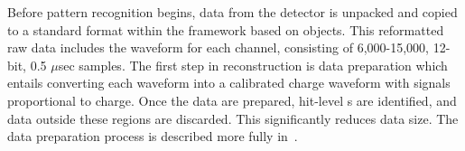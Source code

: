 Before pattern recognition begins, data from the  detector is
unpacked and copied to a standard format within the  framework based on  objects. 
This reformatted raw data includes the waveform for each channel, consisting of 6,000-15,000,  12-bit, 0.5 $\mu$sec samples. 
The first step in reconstruction is data preparation which entails converting each  waveform into a calibrated charge waveform with
signals proportional to charge. Once the data are prepared, hit-level s are identified, and data outside these regions are discarded.  This significantly reduces data size. The data preparation process is described more fully in~\cite{bib:docdb12349}. %

